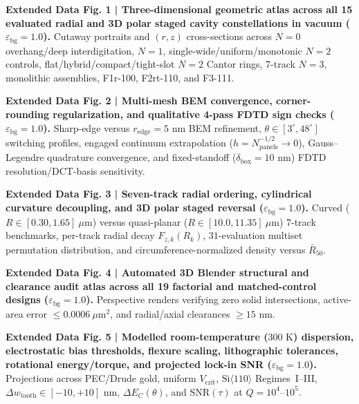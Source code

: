 \documentclass[11pt, a4paper]{article}
\begin{document}
\noindent\textbf{Extended Data Fig. 1 | Three-dimensional geometric atlas across all 15 evaluated radial and 3D polar staged cavity constellations in vacuum ($\varepsilon_{\mathrm{bg}}=1.0$).} Cutaway portraits and $(r,z)$ cross-sections across $N=0$ overhang/deep interdigitation, $N=1$, single-wide/uniform/monotonic $N=2$ controls, flat/hybrid/compact/tight-slot $N=2$ Cantor rings, 7-track $N=3$, monolithic assemblies, F1r-100, F2rt-110, and F3-111.

\smallskip
\noindent\textbf{Extended Data Fig. 2 | Multi-mesh BEM convergence, corner-rounding regularization, and qualitative 4-pass FDTD sign checks ($\varepsilon_{\mathrm{bg}}=1.0$).} Sharp-edge versus $r_{\mathrm{edge}}=5\text{ nm}$ BEM refinement, $\theta \in [3^\circ, 48^\circ]$ switching profiles, engaged continuum extrapolation ($h = N_{\mathrm{panels}}^{-1/2} \to 0$), Gauss--Legendre quadrature convergence, and fixed-standoff ($\delta_{\mathrm{box}}=10\text{ nm}$) FDTD resolution/DCT-basis sensitivity.

\smallskip
\noindent\textbf{Extended Data Fig. 3 | Seven-track radial ordering, cylindrical curvature decoupling, and 3D polar staged reversal ($\varepsilon_{\mathrm{bg}}=1.0$).} Curved ($R \in [0.30, 1.65]\ \mu\text{m}$) versus quasi-planar ($R \in [10.0, 11.35]\ \mu\text{m}$) 7-track benchmarks, per-track radial decay $F_{z,k}(R_k)$, $31$-evaluation multiset permutation distribution, and circumference-normalized density versus $\bar{R}_{50}$.

\smallskip
\noindent\textbf{Extended Data Fig. 4 | Automated 3D Blender structural and clearance audit atlas across all 19 factorial and matched-control designs ($\varepsilon_{\mathrm{bg}}=1.0$).} Perspective renders verifying zero solid intersections, active-area error $\le 0.0006\ \mu\text{m}^2$, and radial/axial clearances $\ge 15\text{ nm}$.

\smallskip
\noindent\textbf{Extended Data Fig. 5 | Modelled room-temperature ($300\text{ K}$) dispersion, electrostatic bias thresholds, flexure scaling, lithographic tolerances, rotational energy/torque, and projected lock-in SNR ($\varepsilon_{\mathrm{bg}}=1.0$).} Projections across PEC/Drude gold, uniform $V_{\mathrm{crit}}$, $\mathrm{Si}\langle 110\rangle$ Regimes~I--III, $\Delta w_{\mathrm{tooth}} \in [-10, +10]\text{ nm}$, $\Delta E_C(\theta)$, and $\mathrm{SNR}(\tau)$ at $Q = 10^4\text{--}10^5$.
\end{document}
